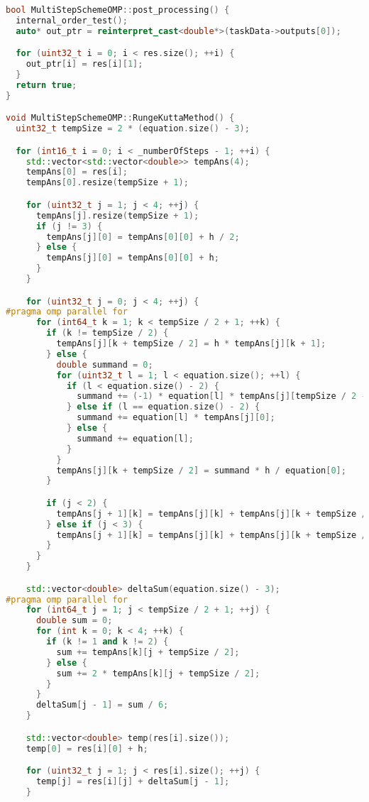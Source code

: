 \documentclass{report}
\begin{document}
\begin{lstlisting}[language=C++,caption=OpenMP версия]
bool MultiStepSchemeOMP::post_processing() {
  internal_order_test();
  auto* out_ptr = reinterpret_cast<double*>(taskData->outputs[0]);

  for (uint32_t i = 0; i < res.size(); ++i) {
    out_ptr[i] = res[i][1];
  }
  return true;
}

void MultiStepSchemeOMP::RungeKuttaMethod() {
  uint32_t tempSize = 2 * (equation.size() - 3);

  for (int16_t i = 0; i < _numberOfSteps - 1; ++i) {
    std::vector<std::vector<double>> tempAns(4);
    tempAns[0] = res[i];
    tempAns[0].resize(tempSize + 1);

    for (uint32_t j = 1; j < 4; ++j) {
      tempAns[j].resize(tempSize + 1);
      if (j != 3) {
        tempAns[j][0] = tempAns[0][0] + h / 2;
      } else {
        tempAns[j][0] = tempAns[0][0] + h;
      }
    }

    for (uint32_t j = 0; j < 4; ++j) {
#pragma omp parallel for
      for (int64_t k = 1; k < tempSize / 2 + 1; ++k) {
        if (k != tempSize / 2) {
          tempAns[j][k + tempSize / 2] = h * tempAns[j][k + 1];
        } else {
          double summand = 0;
          for (uint32_t l = 1; l < equation.size(); ++l) {
            if (l < equation.size() - 2) {
              summand += (-1) * equation[l] * tempAns[j][tempSize / 2 - l + 1];
            } else if (l == equation.size() - 2) {
              summand += equation[l] * tempAns[j][0];
            } else {
              summand += equation[l];
            }
          }
          tempAns[j][k + tempSize / 2] = summand * h / equation[0];
        }

        if (j < 2) {
          tempAns[j + 1][k] = tempAns[j][k] + tempAns[j][k + tempSize / 2] / 2;
        } else if (j < 3) {
          tempAns[j + 1][k] = tempAns[j][k] + tempAns[j][k + tempSize / 2];
        }
      }
    }

    std::vector<double> deltaSum(equation.size() - 3);
#pragma omp parallel for
    for (int64_t j = 1; j < tempSize / 2 + 1; ++j) {
      double sum = 0;
      for (int k = 0; k < 4; ++k) {
        if (k != 1 and k != 2) {
          sum += tempAns[k][j + tempSize / 2];
        } else {
          sum += 2 * tempAns[k][j + tempSize / 2];
        }
      }
      deltaSum[j - 1] = sum / 6;
    }

    std::vector<double> temp(res[i].size());
    temp[0] = res[i][0] + h;

    for (uint32_t j = 1; j < res[i].size(); ++j) {
      temp[j] = res[i][j] + deltaSum[j - 1];
    }


\end{lstlisting}
\end{document}
